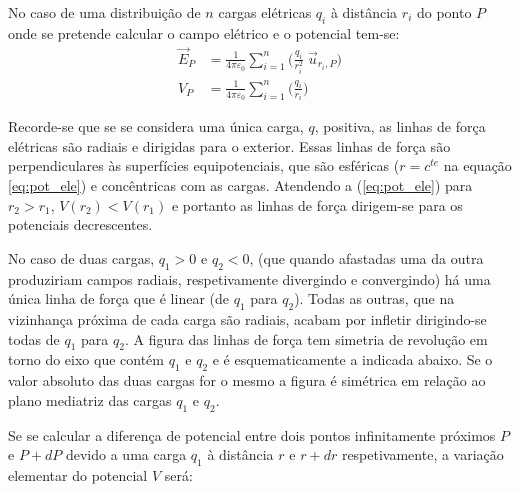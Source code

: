 \documentclass[a4paper,twoside,12pt]{article}      %
\begin{document}
No caso de uma distribuição de $n$ cargas elétricas $q_i$ à distância $r_i$ do ponto $P$ onde se pretende calcular o	campo elétrico e o potencial tem-se:
\begin{align}
	\vec{E}_P &= \frac{1}{4 \pi \varepsilon_0 } \sum_{i=1}^n \Big( \frac{q_i}{ r_i^2}\; \vec{u}_{r_i , P}  \Big) \nonumber \\ 
 V_P &= \frac{1}{4 \pi \varepsilon_0 } \sum_{i=1}^n \Big( \frac{q_i}{ r_i}  \Big) \nonumber
\end{align}



Recorde-se que se se considera uma única carga, $q$, positiva, as linhas de força elétricas são radiais e dirigidas para o exterior. Essas linhas de força são perpendiculares às superfícies equipotenciais, que são esféricas ($r =c^{te}$ na equação \ref{eq:pot_ele}) e concêntricas com as cargas. Atendendo a (\ref{eq:pot_ele}) para $r_2 > r_1$,	$V(r_2) < V(r_1)$ e portanto as linhas de força dirigem-se para os potenciais decrescentes.

No caso de duas cargas, $q_1 > 0$ e $q_2 < 0$, (que quando afastadas uma da outra produziriam campos radiais, respetivamente divergindo e convergindo) há uma única linha de força que é linear (de $q_1$ para $q_2$). Todas as outras, que na vizinhança próxima de cada carga são radiais, acabam por infletir dirigindo-se todas de $q_1$ para $q_2$. A figura das linhas de força tem simetria de revolução em torno do eixo que contém $q_1$ e $q_2$ e é esquematicamente a indicada abaixo. Se o valor absoluto das duas cargas for o mesmo a figura é simétrica em relação ao plano mediatriz das cargas $q_1$ e $q_2$.

Se se calcular a diferença de potencial entre dois pontos infinitamente próximos $P$ e $P+dP$ devido a uma carga $q_1$ à distância $r$ e $r+dr$ respetivamente, a variação elementar do potencial $V$ será:
\end{document}
